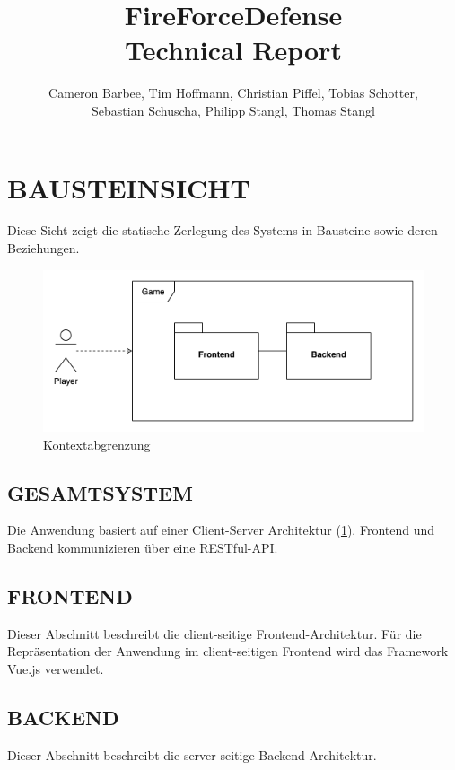 \documentclass[letterpaper, 10 pt, conference]{ieeeconf}
\title{\LARGE 
\textbf{FireForceDefense} \\ Technical Report
}
\author{Cameron Barbee, Tim Hoffmann,  Christian Piffel,  Tobias Schotter,\\  Sebastian Schuscha,  Philipp Stangl,  Thomas Stangl%
}
\begin{document}
\maketitle
\thispagestyle{empty}
\pagestyle{empty}

\section{BAUSTEINSICHT}
Diese Sicht zeigt die statische Zerlegung des Systems in Bausteine sowie
deren Beziehungen.  %

\begin{figure}[thpb]
      \centering
      \includegraphics[scale=0.38]{images/context}
      \caption{Kontextabgrenzung}
      \label{fig:context}
\end{figure}


\subsection{GESAMTSYSTEM}
Die Anwendung basiert auf einer Client-Server Architektur (\ref{fig:context}).  
Frontend und Backend kommunizieren über eine RESTful-API.


\subsection{FRONTEND}
Dieser Abschnitt beschreibt die client-seitige Frontend-Architektur.
Für die Repräsentation der Anwendung im client-seitigen Frontend wird das Framework Vue.js verwendet. 


\subsection{BACKEND}
Dieser Abschnitt beschreibt die server-seitige Backend-Architektur. \\
\end{document}
